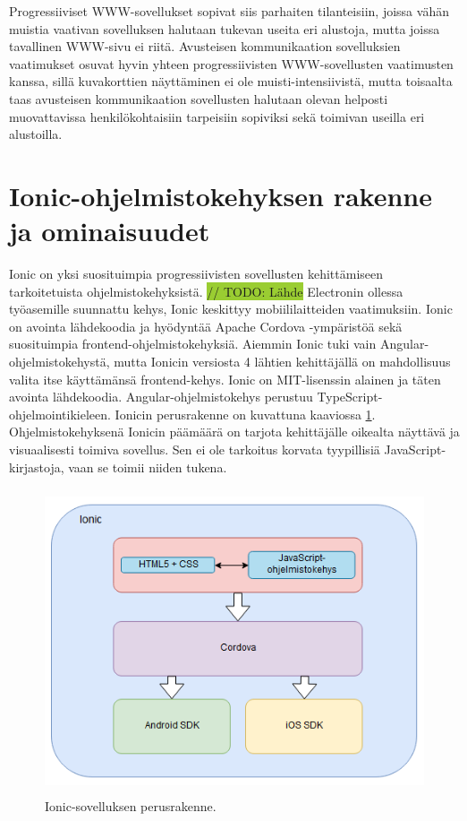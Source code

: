 \documentclass[utf8]{gradu3}
\begin{document}
Progressiiviset WWW-sovellukset sopivat siis parhaiten tilanteisiin, joissa vähän muistia vaativan sovelluksen halutaan tukevan useita eri alustoja, mutta joissa tavallinen WWW-sivu ei riitä. Avusteisen kommunikaation sovelluksien vaatimukset osuvat hyvin yhteen progressiivisten WWW-sovellusten vaatimusten kanssa, sillä kuvakorttien näyttäminen ei ole muisti-intensiivistä, mutta toisaalta taas avusteisen kommunikaation sovellusten halutaan olevan helposti muovattavissa henkilökohtaisiin tarpeisiin sopiviksi sekä toimivan useilla eri alustoilla.

\section{Ionic-ohjelmistokehyksen rakenne ja ominaisuudet}

Ionic on yksi suosituimpia progressiivisten sovellusten kehittämiseen tarkoitetuista ohjelmistokehyksistä. \colorbox{YellowGreen}{// TODO: Lähde} Electronin ollessa työasemille suunnattu kehys, Ionic keskittyy mobiililaitteiden vaatimuksiin. Ionic on avointa lähdekoodia ja hyödyntää Apache Cordova -ympäristöä sekä suosituimpia frontend-ohjelmistokehyksiä. Aiemmin Ionic tuki vain Angular-ohjelmistokehystä, mutta Ionicin versiosta 4 lähtien kehittäjällä on mahdollisuus valita itse käyttämänsä frontend-kehys. Ionic on MIT-lisenssin alainen ja täten avointa lähdekoodia. Angular-ohjelmistokehys perustuu TypeScript-ohjelmointikieleen. Ionicin perusrakenne on kuvattuna kaaviossa \ref{fig:ionic-structure}. Ohjelmistokehyksenä Ionicin päämäärä on tarjota kehittäjälle oikealta näyttävä ja visuaalisesti toimiva sovellus. Sen ei ole tarkoitus korvata tyypillisiä JavaScript-kirjastoja, vaan se toimii niiden tukena. \parencite[]{ionic-documentation}

\begin{figure}[h]\centering
  \includegraphics[height=9cm,keepaspectratio]{ionic-structure}
  \caption[Ionic-sovelluksen perusrakenne]
  {Ionic-sovelluksen perusrakenne.}
  \label{fig:ionic-structure}
\end{figure}
\end{document}
